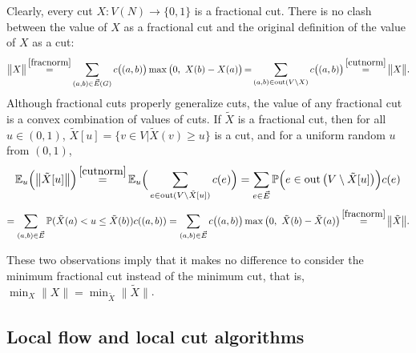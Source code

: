 \documentclass[12pt,a4paper]{article}
\newcommand{\out}{\operatorname{out}}
\newcommand{\vE}{\vec{E}}
\newcommand{\E}{\mathbb{E}}
\renewcommand{\:}{\colon}
\begin{document}
Clearly, every cut $X: V(N)\rightarrow \{0,1\}$ is a fractional cut. 
There is no clash between the value of $X$ as a fractional cut and the original definition of the value of $X$ as a cut: 
\begin{equation*}
\big\|X\big\| \mathop{=}^{\eqref{fracnorm}} \sum_{(a, b) \in \vE(G)} c\big((a, b)\big) \max\big(0,\ X(b) - X(a)\big) \mathop{=} \sum\limits_{(a, b) \in \out(V\setminus X)} c\big((a, b)\big) \mathop{=}^{\eqref{cutnorm}} \big\|X\big\|.
\end{equation*}
Although fractional cuts properly generalize cuts, the value of any fractional cut is a convex combination of values of cuts. 
If $\tilde{X}$ is a fractional cut, then for all $u \in (0, 1)$, $\tilde{X}[u] = \big\{v \in V \big| \tilde{X}(v) \geq u \big\}$ is a cut, and for a uniform random $u$ from $(0, 1)$,
\begin{equation*}
\E_u\Big( \big\|\tilde{X}[u]\big\| \Big) \mathop{=}^{\eqref{cutnorm}} \E_u\Big( \sum\limits_{e \in \out(V\setminus\tilde{X}[u])} c(e) \Big) = \sum\limits_{e \in \vE} \mathbb{P} \Big(e \in \out \big(V\setminus\tilde{X}[u] \big) \Big) c(e)
\end{equation*}
\begin{equation} \label{fractocut}
= \sum\limits_{(a, b) \in \vE} \mathbb{P}(\tilde{X}(a) < u \le \tilde{X}(b)) c((a,b)) = \sum\limits_{(a, b) \in \vE} c\big((a, b)\big) \max\big(0,\ \tilde{X}(b) - \tilde{X}(a)\big) \mathop{=}^{\eqref{fracnorm}} \big\|\tilde{X}\big\|.
\end{equation}

These two observations imply that it makes no difference to consider the minimum fractional cut instead of the minimum cut, that is, $\min_X \big\|X\big\| = \min_{\tilde{X}} \big\|\tilde{X}\big\|$.


\subsection{Local flow and local cut algorithms}
\end{document}
